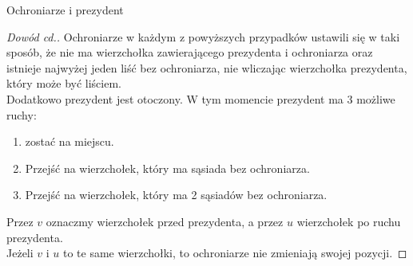 \documentclass[polish]{beamer}
\begin{document}
\begin{frame}{Ochroniarze i prezydent}
    \begin{proof}[Dowód cd.]
        \renewcommand{\qedsymbol}{}
        Ochroniarze w każdym z powyższych przypadków ustawili się w taki sposób, że nie ma wierzchołka zawierającego prezydenta i ochroniarza 
        oraz istnieje najwyżej jeden liść bez ochroniarza, nie wliczając wierzchołka prezydenta, który może być liściem. \\
        Dodatkowo prezydent jest otoczony.
        \pause
        W tym momencie prezydent ma 3 możliwe ruchy:
        \pause
        \begin{enumerate}[<+->]
            \item zostać na miejscu.
            \item Przejść na wierzchołek, który ma sąsiada bez ochroniarza.
            \item Przejść na wierzchołek, który ma 2 sąsiadów bez ochroniarza.
        \end{enumerate} 
        \pause
        Przez $v$ oznaczmy wierzchołek przed prezydenta, a przez $u$ wierzchołek po ruchu prezydenta.\\
        Jeżeli $v$ i $u$ to te same wierzchołki, to ochroniarze nie zmieniają swojej pozycji.
    \end{proof}
\end{frame}
\end{document}
